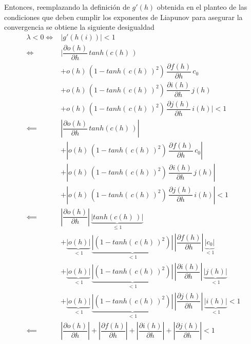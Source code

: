 \documentclass{article}
\begin{document}
\begin{appendices}
		Entonces, reemplazando la definición de $g'(h)$ obtenida en el planteo de las condiciones que deben cumplir los exponentes de Liapunov para asegurar la convergencia se obtiene la siguiente desigualdad
		\begin{equation*}
		\begin{split}
		\lambda < 0 \iff&  |g'(h(i))|  < 1 \\
		\iff& \lvert \dfrac{\partial o(h)}{\partial h} \, tanh( c(h) \, )\\
		&+ o(h) \, (1 - tanh( \, c(h) \, )^2) \, \dfrac{\partial f(h)}{\partial h} \, c_0\\
		&+ o(h) \, (1 - tanh( \, c(h) \, )^2) \, \dfrac{\partial i(h)}{\partial h} \, j(h)\\
		&+ o(h) \, (1 - tanh( \, c(h) \, )^2) \, \dfrac{\partial j(h)}{\partial h} \, i(h) \rvert < 1\\
		\impliedby & \left\lvert \dfrac{\partial o(h)}{\partial h} \, tanh( c(h) \, )\right\rvert \\
		&+ \left\lvert o(h) \, (1 - tanh( \, c(h) \, )^2) \, \dfrac{\partial f(h)}{\partial h} \, c_0 \right\rvert\\
		&+\left\lvert  o(h) \, (1 - tanh( \, c(h) \, )^2) \, \dfrac{\partial i(h)}{\partial h} \, j(h) \right\rvert \\
		&+ \left\lvert o(h) \, (1 - tanh( \, c(h) \, )^2) \, \dfrac{\partial j(h)}{\partial h} \, i(h) \right\rvert < 1\\
		\impliedby & \left\lvert \dfrac{\partial o(h)}{\partial h} \right\rvert \, \underbrace{| tanh( c(h) \, )|}_{\le1} \\
		&+ \underbrace{| o(h) |}_{< 1}\,\underbrace{| (1 - tanh( \, c(h) \, )^2) |}_{<1} \, \left\lvert \dfrac{\partial f(h)}{\partial h} \right\rvert \, \underbrace{| c_0|}_{<1} \\
		&+ \underbrace{| o(h) |}_{< 1}\,\underbrace{| (1 - tanh( \, c(h) \, )^2) |}_{<1} \, \left\lvert \dfrac{\partial i(h)}{\partial h} \right\rvert \, \underbrace{| j(h)|}_{<1} \\
		&+ \underbrace{| o(h) |}_{< 1}\,\underbrace{| (1 - tanh( \, c(h) \, )^2) |}_{<1} \, \left\lvert \dfrac{\partial j(h)}{\partial h} \right\rvert \, \underbrace{| i(h)| }_{<1}< 1\\
		\impliedby & \left\lvert \dfrac{\partial o(h)}{\partial h} \right\rvert + \left\lvert \dfrac{\partial f(h)}{\partial h} \right\rvert + \left\lvert \dfrac{\partial i(h)}{\partial h} \right\rvert + \left\lvert \dfrac{\partial j(h)}{\partial h} \right\rvert <1
		\end{split}

\end{equation*}
\end{appendices}
\end{document}
